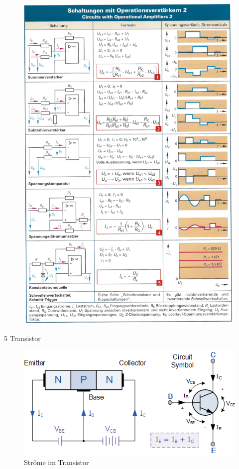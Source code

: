\documentclass[a5paper, 12pt, twoside]{scrartcl}
\begin{document}
\begin{figure}[H]
  \centering
  \includegraphics[width=.95\textwidth]{OPV2}
\end{figure}

{\Large 5 Transistor}

\begin{figure}[H]
  \centering
  \includegraphics[width=.6\textwidth]{Transistor}
  \caption{Ströme im Transistor}
\end{figure}
\end{document}

